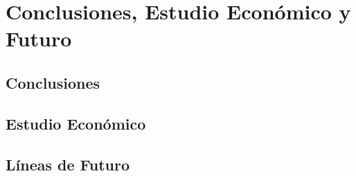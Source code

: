 \chapter{Conclusiones, Estudio Económico y Futuro}

\section{Conclusiones}
\section{Estudio Económico}
\section{Líneas de Futuro}
